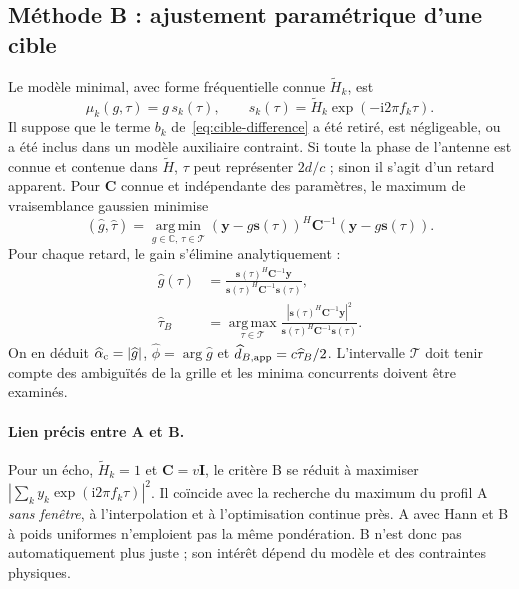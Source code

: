 \documentclass[11pt,a4paper]{article}
\newcommand{\ii}{\mathrm{i}}
\begin{document}
\subsection{Méthode B : ajustement paramétrique d'une cible}

Le modèle minimal, avec forme fréquentielle connue $\widetilde H_k$, est
\begin{equation}\label{eq:cible-B}
 \mu_k(g,\tau)=g\,s_k(\tau),\qquad
 s_k(\tau)=\widetilde H_k\exp(-\ii2\pi f_k\tau).
\end{equation}
Il suppose que le terme $b_k$ de~\eqref{eq:cible-difference} a été retiré,
est négligeable, ou a été inclus dans un modèle auxiliaire contraint.
Si toute la phase de l'antenne est connue et contenue dans $\widetilde H$,
$\tau$ peut représenter $2d/c$ ; sinon il s'agit d'un retard apparent.
Pour $\mathbf C$ connue et indépendante des paramètres, le maximum de
vraisemblance gaussien minimise
\begin{equation}
 (\widehat g,\widehat\tau)=
 \underset{g\in\mathbb C,\,\tau\in\mathcal T}{\operatorname{arg\,min}}
 (\mathbf y-g\mathbf s(\tau))^H\mathbf C^{-1}
 (\mathbf y-g\mathbf s(\tau)).
\end{equation}
Pour chaque retard, le gain s'élimine analytiquement :
\begin{align}
 \widehat g(\tau)&=\frac{\mathbf s(\tau)^H\mathbf C^{-1}\mathbf y}
 {\mathbf s(\tau)^H\mathbf C^{-1}\mathbf s(\tau)},\\
 \widehat\tau_B&=\boxed{\underset{\tau\in\mathcal T}{\operatorname{arg\,max}}
 \frac{|\mathbf s(\tau)^H\mathbf C^{-1}\mathbf y|^2}
 {\mathbf s(\tau)^H\mathbf C^{-1}\mathbf s(\tau)}.}
\end{align}
On en déduit $\widehat\alpha_{\rm c}=|\widehat g|$,
$\widehat\phi=\arg\widehat g$ et $\widehat d_{B,\rm app}=c\widehat\tau_B/2$.
L'intervalle $\mathcal T$ doit tenir compte des ambiguïtés de la grille et
les minima concurrents doivent être examinés.

\paragraph{Lien précis entre A et B.}
Pour un écho, $\widetilde H_k=1$ et $\mathbf C=v\mathbf I$, le critère B
se réduit à maximiser $|\sum_k y_k\exp(\ii2\pi f_k\tau)|^2$.
Il coïncide avec la recherche du maximum du profil A \emph{sans fenêtre},
à l'interpolation et à l'optimisation continue près. A avec Hann et B à poids
uniformes n'emploient pas la même pondération. B n'est donc pas automatiquement
plus juste ; son intérêt dépend du modèle et des contraintes physiques.
\end{document}
